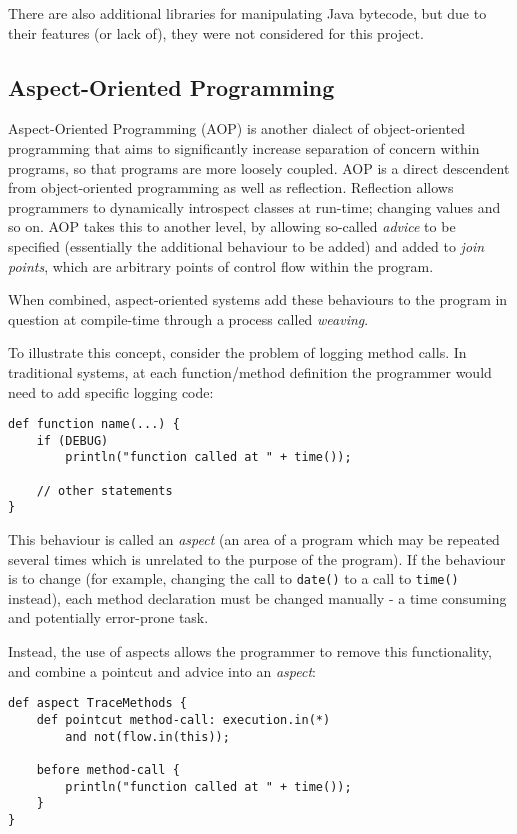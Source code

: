 		There are also additional libraries for manipulating Java bytecode, but due to their features (or lack of), they were not considered for this project.

	\subsection{Aspect-Oriented Programming} \label{sec:instrumentation/alt-instr/aop}
	Aspect-Oriented Programming (AOP) \citep{Kiczales1997} is another dialect of object-oriented programming that aims to significantly increase separation of concern within programs, so that programs are more loosely coupled. AOP is a direct descendent from object-oriented programming as well as reflection. Reflection allows programmers to dynamically introspect classes at run-time; changing values and so on. AOP takes this to another level, by allowing so-called \textit{advice} to be specified (essentially the additional behaviour to be added) and added to \textit{join points}, which are arbitrary points of control flow within the program.
	
	When combined, aspect-oriented systems add these behaviours to the program in question at compile-time through a process called \textit{weaving}.
	
	To illustrate this concept, consider the problem of logging method calls. In traditional systems, at each function/method definition the programmer would need to add specific logging code:
	
	\begin{lstlisting}[caption=Traditional use of advice in programs,label=lst:tradadvice]
def function name(...) {
    if (DEBUG)
        println("function called at " + time());
      
    // other statements
}\end{lstlisting}
	
	This behaviour is called an \textit{aspect} (an area of a program which may be repeated several times which is unrelated to the purpose of the program). If the behaviour is to change (\eg for example, changing the call to \texttt{date()} to a call to \texttt{time()} instead), each method declaration must be changed manually - a time consuming and potentially error-prone task.
	
	Instead, the use of aspects allows the programmer to remove this functionality, and combine a pointcut and advice into an \textit{aspect}:
	
	\begin{lstlisting}[caption=AOP-based advice equivalent to listing \ref{lst:tradadvice},label=lst:aopadvice]
def aspect TraceMethods {
    def pointcut method-call: execution.in(*)
        and not(flow.in(this));
		
    before method-call {
        println("function called at " + time());
    }
}\end{lstlisting}
	
